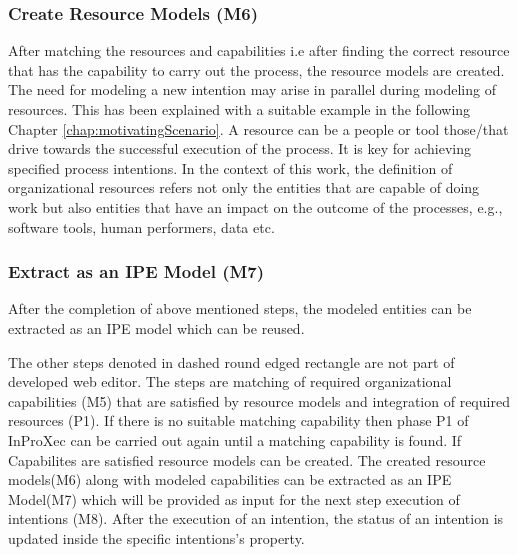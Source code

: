 \subsubsection{Create Resource Models (M6)}  
After matching the resources and capabilities i.e after finding the correct resource that has the capability to carry out the process, the resource models are created. The need for modeling a new intention may arise in parallel during modeling of resources. This has been explained with a suitable example in the following Chapter \ref{chap:motivatingScenario}.  A resource can be a people or tool those/that drive towards the successful execution of the process. It is key for achieving specified process intentions. In the context of this work, the definition of organizational resources refers not only the entities that are capable of doing work but also entities that have an impact on the outcome of the processes, e.g., software tools, human performers, data etc.      

\subsubsection{Extract as an IPE Model (M7)}  
 After the completion of above mentioned steps, the modeled entities can be extracted as an IPE model which can be reused. 

The other steps denoted in dashed round edged rectangle are not part of developed web editor. The steps are matching of required organizational capabilities (M5) that are satisfied by resource models and integration of required resources (P1). If there is no suitable matching capability then phase P1 of InProXec can be carried out again until a matching capability is found. If Capabilites are satisfied resource models can be created. The created resource models(M6) along with modeled capabilities can be extracted as an IPE Model(M7) which will be provided as input for the next step execution of intentions (M8). After the execution of an intention, the status of an intention is updated inside the specific intentions's property. 










